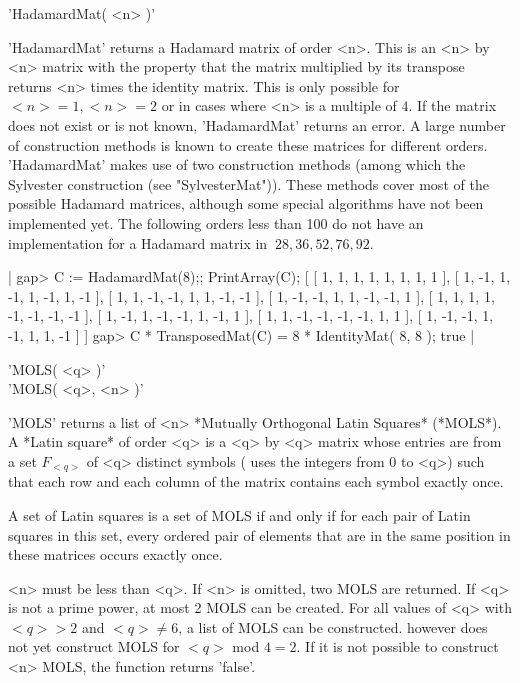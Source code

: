 'HadamardMat( <n> )'

'HadamardMat' returns a Hadamard matrix  of order <n>. This  is an <n> by
<n> matrix with the property that the matrix  multiplied by its transpose
returns <n> times the identity matrix. This is  only possible for $<n>=1,
<n>=2$ or in cases where <n> is a multiple of $4$. If the matrix does not
exist or is not known, 'HadamardMat' returns  an error. A large number of
construction methods  is known  to create  these  matrices for  different
orders. 'HadamardMat' makes use of  two construction methods (among which
the Sylvester   construction (see "SylvesterMat")).   These methods cover
most of the possible  Hadamard matrices, although some special algorithms
have not been implemented yet. The following orders less  than 100 do not
have an implementation for a Hadamard  matrix in {\GUAVA}\:$\ 28, 36, 52,
76, 92.$

|    gap> C := HadamardMat(8);; PrintArray(C);
    [ [   1,   1,   1,   1,   1,   1,   1,   1 ],
      [   1,  -1,   1,  -1,   1,  -1,   1,  -1 ],
      [   1,   1,  -1,  -1,   1,   1,  -1,  -1 ],
      [   1,  -1,  -1,   1,   1,  -1,  -1,   1 ],
      [   1,   1,   1,   1,  -1,  -1,  -1,  -1 ],
      [   1,  -1,   1,  -1,  -1,   1,  -1,   1 ],
      [   1,   1,  -1,  -1,  -1,  -1,   1,   1 ],
      [   1,  -1,  -1,   1,  -1,   1,   1,  -1 ] ]
    gap> C * TransposedMat(C) = 8 * IdentityMat( 8, 8 );
    true |


'MOLS( <q> )'\\
'MOLS( <q>, <n> )'

'MOLS'   returns a   list of  <n>    *Mutually Orthogonal Latin  Squares*
(*MOLS*). A *Latin   square* of order <q> is   a <q> by <q>  matrix whose
entries are from a  set $F_{<q>}$ of <q>  distinct symbols ({\GUAVA} uses
the integers from 0  to <q>) such that each   row and each column  of the
matrix contains each symbol exactly once.

A set of Latin squares is a set of MOLS  if and only  if for each pair of
Latin squares in this set, every ordered pair of elements that are in the
same position in these matrices occurs exactly once.

<n> must be less than <q>.  If <n> is omitted, two  MOLS are returned. If
<q> is not a prime power,  at most 2 MOLS  can be created. For all values
of  <q> with  $<q>   > 2$ and $<q>    \neq 6$, a   list  of  MOLS can  be
constructed. {\GUAVA} however  does not yet  construct MOLS for $<q>$ mod
$4 = 2$.  If  it  is not possible   to construct <n> MOLS,  the  function
returns 'false'.

